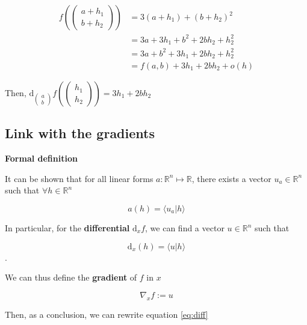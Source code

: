 \documentclass{tufte-handout}
\newcommand{\ud}{\mathrm{d}}
\begin{document}
 \begin{align*}
 f(\begin{pmatrix}
 a + h_1\\ 
 b + h_2
 \end{pmatrix}) &= 3(a + h_1) + (b + h_2)^2\\
 					&= 3 a + 3h_1 + b^2 + 2 b h_2 + h_2^2\\
                    &= 3 a + b^2 + 3 h_1 + 2 b h_2 + h_2^2\\
                    &= f(a, b) + 3 h_1 + 2 b h_2 + o(h)
 \end{align*}

Then, $ \ud_{\begin{pmatrix}
a \\
b
\end{pmatrix}}f (\begin{pmatrix}
h_1\\
h_2
\end{pmatrix}) =  3 h_1 + 2 b h_2 $

 \subsection{Link with the gradients}
 
 
 
 \textbf{Formal definition}
 
 It can be shown that for all linear forms $ a : \mathbb{R}^n \mapsto \mathbb{R} $, there exists a vector $ u_a \in \mathbb{R}^n $ such that $ \forall h \in \mathbb{R}^n $
 
 
$$ a(h) =  \langle u_a  | h \rangle $$

In particular, for the \textbf{differential} $ \ud_x f $, we can find a vector $ u \in \mathbb{R}^n $ such that 

$$ \ud_x (h) = \langle u | h \rangle $$.


We can thus define the \textbf{gradient} of $ f $ in $ x $

$$ \nabla_x f := u $$

Then, as a conclusion, we can rewrite equation \ref{eq:diff}
\end{document}
